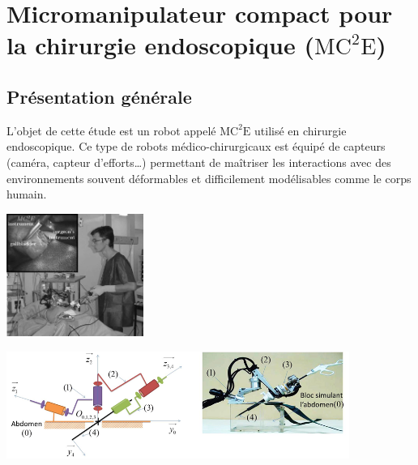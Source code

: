 \documentclass[10pt,fleqn]{article} %
\begin{document}

\vspace{7cm}
\pagestyle{fancy}
\thispagestyle{plain}

\def\columnseprulecolor{\color{ocre}}
\setlength{\columnseprule}{0.4pt} 


\section{Micromanipulateur compact pour la chirurgie endoscopique ($\text{MC}^2\text{E}$)}
\subsection{Présentation générale}
L’objet de cette étude est un robot appelé $\text{MC}^2\text{E}$ utilisé en chirurgie endoscopique. Ce type de
robots médico-chirurgicaux est équipé de capteurs (caméra, capteur d’efforts…) permettant de maîtriser
les interactions avec des environnements souvent déformables et difficilement modélisables comme le
corps humain.

\begin{center}
\begin{minipage}[c]{.1\linewidth}
\begin{center}
\includegraphics[height=4cm]{images/Sujet/images/fig_01}
\end{center}
\end{minipage} \hfill
\begin{minipage}[c]{.65\linewidth}
\begin{center}
\includegraphics[height=3.5cm]{images/Sujet/images/fig_02}
\end{center}
\end{minipage}
\end{center}
\end{document}
